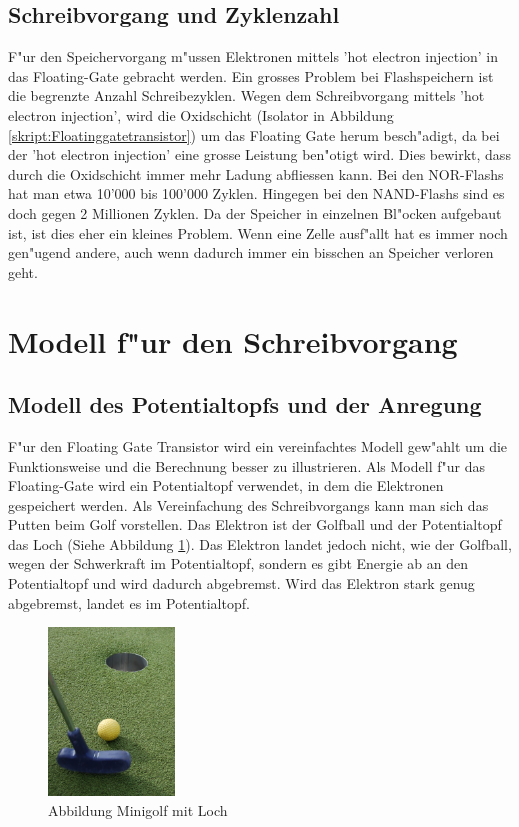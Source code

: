 \begin{refsection}
\subsection{Schreibvorgang und Zyklenzahl}
F"ur den Speichervorgang m"ussen Elektronen mittels 'hot electron injection'
in das Floating-Gate gebracht werden. Ein grosses Problem bei
Flashspeichern ist die begrenzte Anzahl Schreibezyklen.
Wegen dem Schreibvorgang mittels 'hot electron injection', wird die
Oxidschicht (Isolator in Abbildung \ref{skript:Floatinggatetransistor}) um das Floating Gate herum
besch"adigt, da bei der 'hot electron injection' eine grosse Leistung
ben"otigt wird.
Dies bewirkt, dass durch die Oxidschicht immer mehr Ladung abfliessen kann.
Bei den NOR-Flashs hat man etwa 10'000 bis 100'000 Zyklen.
Hingegen bei den NAND-Flashs sind es doch gegen 2 Millionen Zyklen.
Da der Speicher in einzelnen Bl"ocken aufgebaut ist, ist dies
eher ein kleines Problem.
Wenn eine Zelle ausf"allt hat es immer noch gen"ugend andere, auch wenn
dadurch immer ein bisschen an Speicher verloren geht.

\section{Modell f"ur den Schreibvorgang}
\subsection{Modell des Potentialtopfs und der Anregung}
F"ur den Floating Gate Transistor wird ein vereinfachtes Modell
gew"ahlt um die Funktionsweise und die Berechnung besser zu illustrieren.
Als Modell f"ur das Floating-Gate wird ein Potentialtopf verwendet,
in dem die Elektronen gespeichert werden.
Als Vereinfachung des Schreibvorgangs kann man sich das Putten beim
Golf vorstellen.
Das Elektron ist der Golfball und der Potentialtopf das Loch (Siehe Abbildung \ref{skript:Minigolf}).
Das Elektron landet jedoch nicht, wie der Golfball, wegen der Schwerkraft
im Potentialtopf, sondern es gibt Energie ab an den Potentialtopf und
wird dadurch abgebremst.
Wird das Elektron stark genug abgebremst, landet es im Potentialtopf.

\begin{figure}
\centering
\includegraphics[width=0.3\textwidth]{flash/graphics/Minigolf.jpg}
\caption{Abbildung Minigolf mit Loch \cite{flash:golf}
\label{skript:Minigolf}}
\end{figure}


\end{refsection}
